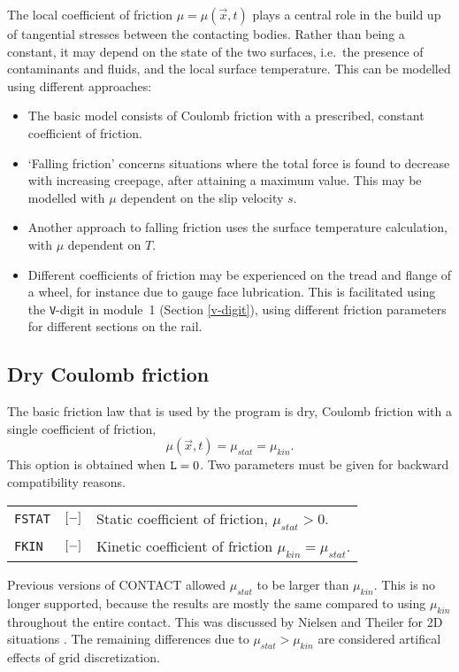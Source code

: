 \documentclass[12pt]{report}
\newenvironment{inputvars}{\vspace{0.4\baselineskip}%

\begin{tabular}{>{\raggedright}p{22mm}p{19mm}p{113mm}}}{
\end{tabular}

}
\newcommand{\inpvar}[3]{{\small\tt #1} & $#2$ & #3 \\[1ex]}
\begin{document}
The local coefficient of friction $\mu=\mu(\vec{x},t)$ plays a central role
in the build up of tangential stresses between the contacting bodies.
Rather than being a constant, it may depend on the state of the two
surfaces, i.e.\ the presence of contaminants and fluids, and the local
surface temperature. This can be modelled using different approaches:
\begin{itemize}
\item The basic model consists of Coulomb friction with a prescribed,
        constant coefficient of friction.
\item `Falling friction' concerns situations where the total force is
        found to decrease with increasing creepage, after attaining a
        maximum value. This may be modelled with $\mu$ dependent on the
        slip velocity $s$.
\item Another approach to falling friction uses the surface temperature
        calculation, with $\mu$ dependent on $T$.
\item Different coefficients of friction may be experienced on the tread
        and flange of a wheel, for instance due to gauge face lubrication.
        This is facilitated using the {\tt V}-digit in module~1 (Section
        \ref{v-digit}), using different friction parameters for
        different sections on the rail.
\end{itemize}

\subsection{Dry Coulomb friction}

The basic friction law that is used by the program is dry, Coulomb friction
with a single coefficient of friction, 
\begin{equation}\label{eq:coulomb_law}
   \mu(\vec{x},t) = \mu_{stat} = \mu_{kin} .
\end{equation}
This option is obtained when ${\tt L}=0$. Two parameters must be given for
backward compatibility reasons.
\begin{inputvars}
\inpvar{FSTAT}{\bunit{-}}{Static coefficient of friction, $\mu_{stat}>0$.}
\inpvar{FKIN}{\bunit{-}}{Kinetic coefficient of friction $\mu_{kin}=\mu_{stat}$.}
\end{inputvars}
Previous versions of CONTACT allowed $\mu_{stat}$ to be larger than
$\mu_{kin}$. This is no longer supported, because the results are mostly
the same compared to using $\mu_{kin}$ throughout the entire contact.
This was discussed by Nielsen and Theiler for 2D situations
\cite{Nielsen1996}. The remaining differences due to $\mu_{stat}>\mu_{kin}$
are considered artifical effects of grid discretization. 
\end{document}
